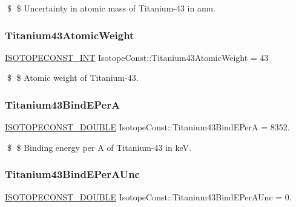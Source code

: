 \$ \$ Uncertainty in atomic mass of Titanium-\/43 in amu. \mbox{\label{group___isotope_const-_titanium-_ti43_gad2b3a6982f74c04ffe04122868461839}} 
\subsubsection{\texorpdfstring{Titanium43\+Atomic\+Weight}{Titanium43AtomicWeight}}
{\footnotesize\ttfamily \mbox{\hyperlink{group___isotope_const-_macros_ga5f18360b3e99483a35c32d789e62621c}{I\+S\+O\+T\+O\+P\+E\+C\+O\+N\+S\+T\+\_\+\+I\+NT}} Isotope\+Const\+::\+Titanium43\+Atomic\+Weight = 43}

\$ \$ Atomic weight of Titanium-\/43. \mbox{\label{group___isotope_const-_titanium-_ti43_ga397ca62c38fdae5feee0cb92b9cb7361}} 
\subsubsection{\texorpdfstring{Titanium43\+Bind\+E\+PerA}{Titanium43BindEPerA}}
{\footnotesize\ttfamily \mbox{\hyperlink{group___isotope_const-_macros_ga8f45a7272ce02c0b4c65c44636ed719a}{I\+S\+O\+T\+O\+P\+E\+C\+O\+N\+S\+T\+\_\+\+D\+O\+U\+B\+LE}} Isotope\+Const\+::\+Titanium43\+Bind\+E\+PerA = 8352.}

\$ \$ Binding energy per A of Titanium-\/43 in keV. \mbox{\label{group___isotope_const-_titanium-_ti43_ga2740a5138b28373415b3a2332bcf5ebc}} 
\subsubsection{\texorpdfstring{Titanium43\+Bind\+E\+Per\+A\+Unc}{Titanium43BindEPerAUnc}}
{\footnotesize\ttfamily \mbox{\hyperlink{group___isotope_const-_macros_ga8f45a7272ce02c0b4c65c44636ed719a}{I\+S\+O\+T\+O\+P\+E\+C\+O\+N\+S\+T\+\_\+\+D\+O\+U\+B\+LE}} Isotope\+Const\+::\+Titanium43\+Bind\+E\+Per\+A\+Unc = 0.}

